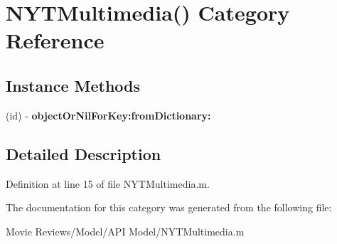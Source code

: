 \section{N\+Y\+T\+Multimedia() Category Reference}
\label{category_n_y_t_multimedia_07_08}
\subsection*{Instance Methods}
\begin{DoxyCompactItemize}
\item 
(id) -\/ {\bfseries object\+Or\+Nil\+For\+Key\+:from\+Dictionary\+:}\label{category_n_y_t_multimedia_07_08_a19ffc26a0d5092166ac5e53d7af568df}

\end{DoxyCompactItemize}


\subsection{Detailed Description}


Definition at line 15 of file N\+Y\+T\+Multimedia.\+m.



The documentation for this category was generated from the following file\+:\begin{DoxyCompactItemize}
\item 
Movie Reviews/\+Model/\+A\+P\+I Model/N\+Y\+T\+Multimedia.\+m\end{DoxyCompactItemize}
